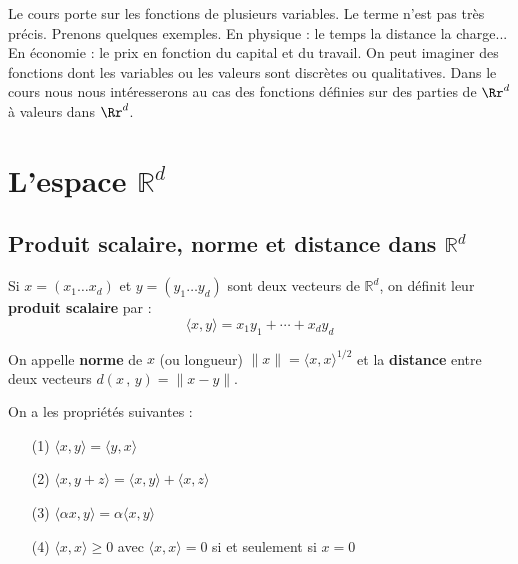 \documentclass[class=report,crop=false]{standalone}
\begin{document}


\tableofcontents

Le cours porte sur les fonctions de plusieurs variables. Le terme n'est pas tr\`es précis. Prenons quelques exemples.
En physique : le temps la distance la charge...
En économie : le prix en fonction du capital et du travail.
On peut imaginer des fonctions dont les variables ou les valeurs sont discr\`etes ou qualitatives.
Dans le cours nous nous intéresserons au cas des fonctions définies sur des parties de $\Rr^d$ \`a valeurs dans $\Rr^d$.



\newpage
\section{L'espace $\mathbb{R}^d$}
\subsection{Produit scalaire, norme et distance dans $\mathbb{R}^d$}

\begin{definition}
Si $x = (x_{1} \dots x_{d})$ et $y = (y_{1} \dots y_{d})$ sont deux vecteurs de $\mathbb{R}^d$, on définit leur {\bf produit scalaire} par :
$$\langle x, y \rangle= x_{1} y_{1} + \cdots + x_{d} y_{d}$$
\end{definition}

\begin{definition}
On appelle {\bf norme} de $x$ (ou longueur) $\|x\| = \langle x, x \rangle^{1/2}$ et la {\bf distance} entre deux vecteurs $d(x\,,\,y) = \|x - y\|$.
\end{definition}

\begin{proposition}
On a les propriétés suivantes :
\begin{enumerate}
\item[(1)] $\langle x, y \rangle = \langle y, x \rangle$
\item[(2)] $\langle x, y+z \rangle = \langle x, y \rangle + \langle x, z \rangle$
\item[(3)] $\langle \alpha x, y \rangle = \alpha \langle x, y \rangle$
\item[(4)] $\langle x, x \rangle \geqslant 0$ avec $\langle x, x \rangle = 0$ si et seulement si $x = 0$
\end{enumerate}
\end{proposition}
\end{document}

